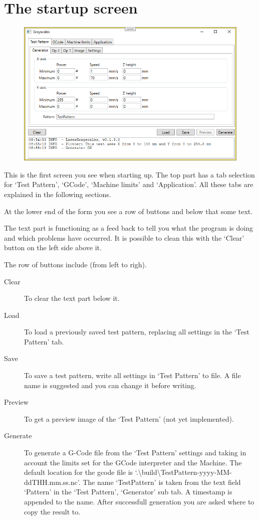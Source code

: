 \section{The startup screen}\label{StartupScreen}
\begin{figure}[h!]
    \centering
    \includegraphics[width=0.8\linewidth]{./images/Grayscales-v0.1.3.png}
\end{figure}

This is the first screen you see when starting up. The top part has a tab selection for `Test Pattern', `GCode', `Machine limits' and `Application'. All these tabs
are explained in the following sections.

At the lower end of the form you see a row of buttons and below that some text.

The text part is functioning as a feed back to tell you what the program is doing and which problems have occurred. It is possible to clean this with the `Clear' button
on the left side above it.

The row of buttons include (from left to righ).
\begin{description}
    \item[Clear] To clear the text part below it.
    \item[Load]  To load a previously saved test pattern, replacing all settings in the `Test Pattern' tab.
    \item[Save]  To save a test pattern, write all settings in `Test Pattern' to file. A file name is suggested and you can change it before writing.
    \item[Preview] To get a preview image of the `Test Pattern' (not yet implemented).
    \item[Generate] To generate a G-Code file from the `Test Pattern' settings and taking in account the limits set for the GCode interpreter and the Machine.
                    The default location for the gcode file is `.\textbackslash{}build\textbackslash{}TestPattern-yyyy-MM-ddTHH.mm.ss.nc'. The name `TestPattern' is
                    taken from the text field `Pattern' in the `Test Pattern', `Generator' sub tab. A timestamp is appended to the name. After successfull generation
                    you are asked where to copy the result to.
\end{description}

